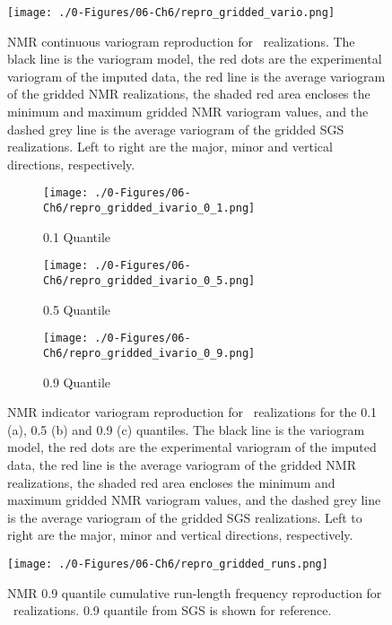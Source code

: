 \begin{figure}[htb!]
    \centering
    \texttt{[image: ./0-Figures/06-Ch6/repro\_gridded\_vario.png]}
    \caption{\gls{NMR} continuous variogram reproduction for \csnreals \ realizations. The black line is the variogram model, the red dots are the experimental variogram of the imputed data, the red line is the average variogram of the gridded \gls{NMR} realizations, the shaded red area encloses the minimum and maximum gridded \gls{NMR} variogram values, and the dashed grey line is the average variogram of the gridded \gls{SGS} realizations. Left to right are the major, minor and vertical directions, respectively.}
    \label{fig:repro_gridded_vario}
\end{figure}

\begin{figure}
    \begin{subfigure}{1.0\textwidth}
        \centering
        \texttt{[image: ./0-Figures/06-Ch6/repro\_gridded\_ivario\_0\_1.png]}
        \caption{0.1 Quantile}
    \end{subfigure}
    \begin{subfigure}{1.0\textwidth}
        \centering
        \texttt{[image: ./0-Figures/06-Ch6/repro\_gridded\_ivario\_0\_5.png]}
        \caption{0.5 Quantile}
    \end{subfigure}
    \begin{subfigure}{1.0\textwidth}
        \centering
        \texttt{[image: ./0-Figures/06-Ch6/repro\_gridded\_ivario\_0\_9.png]}
        \caption{0.9 Quantile}
    \end{subfigure}
    \caption{\gls{NMR} indicator variogram reproduction for \csnreals \ realizations for the 0.1 (a), 0.5 (b) and 0.9 (c) quantiles. The black line is the variogram model, the red dots are the experimental variogram of the imputed data, the red line is the average variogram of the gridded \gls{NMR} realizations, the shaded red area encloses the minimum and maximum gridded \gls{NMR} variogram values, and the dashed grey line is the average variogram of the gridded \gls{SGS} realizations. Left to right are the major, minor and vertical directions, respectively.}
    \label{fig:repro_gridded_ivario}
\end{figure}

\begin{figure}[htb!]
    \centering
    \texttt{[image: ./0-Figures/06-Ch6/repro\_gridded\_runs.png]}
    \caption{\gls{NMR} 0.9 quantile cumulative run-length frequency reproduction for \csnreals \ realizations. 0.9 quantile from \gls{SGS} is shown for reference.}
    \label{fig:repro_gridded_runs}
\end{figure}

